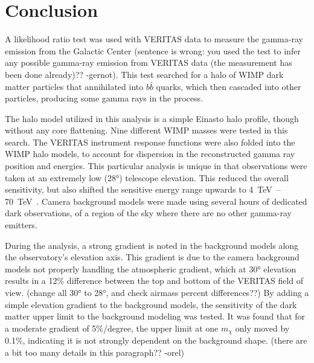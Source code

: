 \cleartooddpage[\thispagestyle{empty}]
\chapter{Conclusion}


A likelihood ratio test was used with VERITAS data to measure the gamma-ray emission from the Galactic Center {\color{red}(sentence is wrong: you used the test to infer any possible gamma-ray emission from VERITAS data (the measurement has been done already)?? -gernot)}.
This test searched for a halo of WIMP dark matter particles that annihilated into $b\bar{b}$ quarks, which then cascaded into other particles, producing some gamma rays in the process.

The halo model utilized in this analysis is a simple Einasto halo profile, though without any core flattening.
Nine different WIMP masses were tested in this search.
The VERITAS instrument response functions were also folded into the WIMP halo models, to account for dispersion in the reconstructed gamma ray position and energies.
This particular analysis is unique in that observations were taken at an extremely low (\nicetilde{}\ang{28}) telescope elevation.
This reduced the overall sensitivity, but also shifted the sensitive energy range upwards to \SIrange{4}{70}{\TeV{}}.
Camera background models were made using several hours of dedicated dark observations, of a region of the sky where there are no other gamma-ray emitters.

During the analysis, a strong gradient is noted in the background models along the observatory's elevation axis.
This gradient is due to the camera background models not properly handling the atmospheric gradient, which at \ang{30} elevation results in a \nicetilde{}12\% difference between the top and bottom of the VERITAS field of view.
{\color{red}(change all \ang{30} to \ang{28}, and check airmass percent differences??)}
By adding a simple elevation gradient to the background models, the sensitivity of the dark matter upper limit to the background modeling was tested.
It was found that for a moderate gradient of 5\%/degree, the upper limit at one $m_{\chi}$ only moved by 0.1\%, indicating it is not strongly dependent on the background shape.
{\color{red}(there are a bit too many details in this paragraph?? -orel)}

